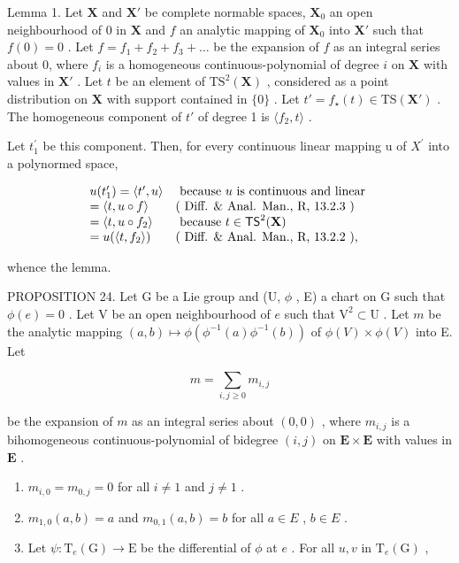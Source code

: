 Lemma 1. Let \(\mathbf{X}\) and \(\mathbf{X}'\) be complete normable spaces, \(\mathbf{X}_0\) an open neighbourhood of 0 in \(\mathbf{X}\) and \(f\) an analytic mapping of \(\mathbf{X}_0\) into \(\mathbf{X}'\) such that \(f(0) = 0\) . Let \(f = f_1 + f_2 + f_3 + \dots\) be the expansion of \(f\) as an integral series about 0, where \(f_i\) is a homogeneous continuous-polynomial of degree \(i\) on \(\mathbf{X}\) with values in \(\mathbf{X}'\) . Let \(t\) be an element of \(\mathrm{TS}^2 (\mathbf{X})\) , considered as a point distribution on \(\mathbf{X}\) with support contained in \(\{0\}\) . Let \(t' = f_{\star}(t) \in \mathrm{TS}(\mathbf{X}')\) . The homogeneous component of \(t'\) of degree 1 is \(\langle f_2, t \rangle\) .

Let \(t_{1}^{\prime}\) be this component. Then, for every continuous linear mapping u of \(X^{\prime}\) into a polynormed space,

\[
\begin{array}{l l} u (t _ {1} ^ {\prime}) = \langle t ^ {\prime}, u \rangle & \text { because   } u \text {   is   continuous   and   linear } \\ = \langle t, u \circ f \rangle & (\text { Diff.   \&   Anal.   Man.,   R,   13.2.3 }) \\ = \langle t, u \circ f _ {2} \rangle & \text { because   } t \in \mathsf {T S} ^ {2} (\mathbf {X}) \\ = u (\langle t, f _ {2} \rangle) & (\text { Diff.   \&   Anal.   Man.,   R,   13.2.2 }), \end{array}
\]

whence the lemma.

PROPOSITION 24. Let G be a Lie group and (U, \(\phi\) , E) a chart on G such that \(\phi(e) = 0\) . Let V be an open neighbourhood of \(e\) such that \(\mathrm{V}^2 \subset \mathrm{U}\) . Let \(m\) be the analytic mapping \((a, b) \mapsto \phi(\phi^{-1}(a)\phi^{-1}(b))\) of \(\phi(V) \times \phi(V)\) into E. Let

\[
m = \sum_ {i, j \geqslant 0} m _ {i, j}
\]

be the expansion of \(m\) as an integral series about \((0,0)\) , where \(m_{i,j}\) is a bihomogeneous continuous-polynomial of bidegree \((i,j)\) on \(\mathbf{E} \times \mathbf{E}\) with values in \(\mathbf{E}\) .

\begin{enumerate}
\def\labelenumi{(\roman{enumi})}
\item
  \(m_{i,0} = m_{0,j} = 0\) for all \(i \neq 1\) and \(j \neq 1\) .
\item
  \(m_{1,0}(a,b)=a\) and \(m_{0,1}(a,b)=b\) for all \(a\in E\) , \(b\in E\) .
\item
  Let \(\psi: \mathrm{T}_e(\mathrm{G}) \to \mathrm{E}\) be the differential of \(\phi\) at \(e\) . For all \(u, v\) in \(\mathrm{T}_e(\mathrm{G})\) ,
\end{enumerate}

